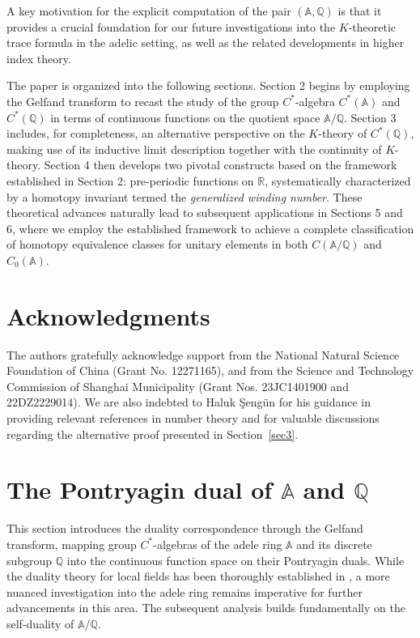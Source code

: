 \documentclass[11pt]{article}
\newcommand{\Q}{\mathbb{Q}}
\newcommand{\A}{\mathbb{A}}
\theoremstyle{remark}
\begin{document}
A key motivation for the explicit computation of the pair $(\mathbb{A}, \mathbb{Q})$ is that it provides a crucial foundation for our future investigations into the $K$-theoretic trace formula \cite{MR4200263} in the adelic setting, as well as the related developments in higher index theory.

The paper is organized into the following sections. Section 2 begins by employing the Gelfand transform to recast the study of the group $C^*$-algebra $C^*(\mathbb{A})$ and $C^*( \mathbb{Q})$ in terms of continuous functions on the quotient space $\mathbb{A}/\mathbb{Q}$. Section 3 includes, for completeness, an alternative perspective on the $K$-theory of $C^*(\Q)$, 
making use of its inductive limit description together with the continuity of $K$-theory. Section 4 then develops two pivotal constructs based on the framework established in Section 2: pre-periodic functions on $\mathbb{R}$, systematically characterized by a homotopy invariant termed the \textit{generalized winding number}. These theoretical advances naturally lead to subsequent applications in Sections 5 and 6, where we employ the established framework to achieve a complete classification of homotopy equivalence classes for unitary elements in both $C(\mathbb{A}/\mathbb{Q})$ and $C_0(\mathbb{A})$.

\section*{Acknowledgments} 
The authors gratefully acknowledge support from the National Natural Science Foundation of China (Grant No. 12271165), and from the Science and Technology Commission of Shanghai Municipality (Grant Nos. 23JC1401900 and 22DZ2229014).
We are also indebted to Haluk Şengün for his guidance in providing relevant references in number theory and for valuable discussions regarding the alternative proof presented in Section~\ref{sec3}.

\section{The Pontryagin dual of \texorpdfstring{\(\A\)}{A} and \texorpdfstring{\(\mathbb{Q}\)}{Q}}

This section introduces the duality correspondence through the Gelfand transform, mapping group $C^*$-algebras of the adele ring $\mathbb{A}$ and its discrete subgroup $\mathbb{Q}$ into the continuous function space on their Pontryagin duals. While the duality theory for local fields has been thoroughly established in \cite{MR1344916}, a more nuanced investigation into the adele ring remains imperative for further advancements in this area. The subsequent analysis builds fundamentally on the self-duality of $\A/\mathbb{Q}$.
\end{document}
